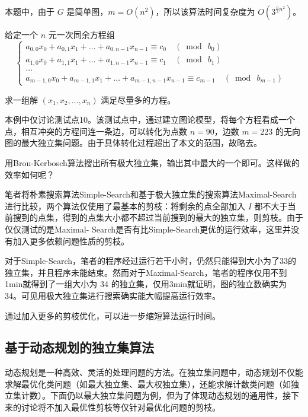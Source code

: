 \documentclass[lang=cn,11pt,a4paper]{elegantpaper}
\begin{document}
本题中，由于 $G$ 是简单图，$m = O(n^2)$，所以该算法时间复杂度为 $O(3^{\frac{n}{3}n^2})$。

\begin{example}[小Q运动季测试点10]\label{example2}
    给定一个 $n$ 元一次同余方程组
    \[\begin{cases}
        a_{0,0} x_{0}+a_{0,1} x_{1}+\ldots+a_{0, n-1} x_{n-1} \equiv c_{0} \quad \left(\bmod\ b_{0}\right) \\
        a_{1,0} x_{0}+a_{1,1} x_{1}+\ldots+a_{1, n-1} x_{n-1} \equiv c_{1} \quad\left(\bmod\ b_{1}\right) \\
        \ldots & \\
        a_{m-1,0} x_{0}+a_{m-1,1} x_{1}+\ldots+a_{m-1, n-1} x_{n-1} \equiv c_{m-1} \quad\left(\bmod\ b_{m-1}\right)
    \end{cases}\]
\end{example}
求一组解 $(x_1, x_2, \dots, x_n)$ 满足尽量多的方程。

本例中仅讨论测试点10。该测试点中，通过建立图论模型，将每个方程看成一个点，相互冲突的方程间连一条边，可以转化为点数 $n = 90$，边数 $m = 223$ 的无向图的最大独立集问题。由于具体转化过程超出了本文的范围，故略去。

用Bron-Kerbosch算法搜出所有极大独立集，输出其中最大的一个即可。这样做的效率如何呢？

笔者将朴素搜索算法Simple-Search和基于极大独立集的搜索算法Maximal-Search进行比较，两个算法仅使用了最基本的剪枝：将剩余的点全部加入 $I$ 都不大于当前搜到的点集，得到的点集大小都不超过当前搜到的最大的独立集，则剪枝。由于仅仅测试的是Maximal- Search是否有比Simple-Search更优的运行效率，这里并没有加入更多依赖问题性质的剪枝。

对于Simple-Search，笔者的程序经过运行若干小时，仍然只能得到大小为了33的独立集，并且程序未能结束。然而对于Maximal-Search，笔者的程序仅用不到1min就得到了一组大小为 34 的独立集，仅用3min就证明，图的独立数确实为 34。可见用极大独立集进行搜索确实能大幅提高运行效率。

通过加入更多的剪枝优化，可以进一步缩短算法运行时间。

\subsection{基于动态规划的独立集算法}
动态规划是一种高效、灵活的处理问题的方法。在独立集问题中，动态规划不仅能求解最优化类问题（如最大独立集、最大权独立集），还能求解计数类问题（如独立集计数）。下面仍以最大独立集问题为例，但为了体现动态规划的通用性，接下来的讨论将不加入最优性剪枝等仅针对最优化问题的剪枝。
\end{document}

